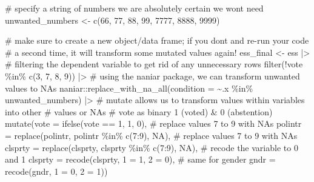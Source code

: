 \documentclass[
  letterpaper,
  DIV=11,
  numbers=noendperiod]{scrreprt}
\newenvironment{Shaded}{\begin{snugshade}}{\end{snugshade}}
\newcommand{\AttributeTok}[1]{\textcolor[rgb]{0.40,0.45,0.13}{#1}}
\newcommand{\CommentTok}[1]{\textcolor[rgb]{0.37,0.37,0.37}{#1}}
\newcommand{\ConstantTok}[1]{\textcolor[rgb]{0.56,0.35,0.01}{#1}}
\newcommand{\DecValTok}[1]{\textcolor[rgb]{0.68,0.00,0.00}{#1}}
\newcommand{\FunctionTok}[1]{\textcolor[rgb]{0.28,0.35,0.67}{#1}}
\newcommand{\NormalTok}[1]{\textcolor[rgb]{0.00,0.23,0.31}{#1}}
\newcommand{\OtherTok}[1]{\textcolor[rgb]{0.00,0.23,0.31}{#1}}
\newcommand{\SpecialCharTok}[1]{\textcolor[rgb]{0.37,0.37,0.37}{#1}}
\newcommand{\StringTok}[1]{\textcolor[rgb]{0.13,0.47,0.30}{#1}}
\begin{document}
\begin{Shaded}
\begin{Highlighting}[]
\CommentTok{\# specify a string of numbers we are absolutely certain we won\textquotesingle{}t need}
\NormalTok{unwanted\_numbers }\OtherTok{\textless{}{-}} \FunctionTok{c}\NormalTok{(}\DecValTok{66}\NormalTok{, }\DecValTok{77}\NormalTok{, }\DecValTok{88}\NormalTok{, }\DecValTok{99}\NormalTok{, }\DecValTok{7777}\NormalTok{, }\DecValTok{8888}\NormalTok{, }\DecValTok{9999}\NormalTok{)}

\CommentTok{\# make sure to create a new object/data frame; if you don\textquotesingle{}t and re{-}run your code}
\CommentTok{\# a second time, it will transform some mutated values again!}
\NormalTok{ess\_final }\OtherTok{\textless{}{-}}\NormalTok{ ess }\SpecialCharTok{|\textgreater{}} 
  \CommentTok{\# filtering the dependent variable to get rid of any unnecessary rows}
  \FunctionTok{filter}\NormalTok{(}\SpecialCharTok{!}\NormalTok{vote }\SpecialCharTok{\%in\%} \FunctionTok{c}\NormalTok{(}\DecValTok{3}\NormalTok{, }\DecValTok{7}\NormalTok{, }\DecValTok{8}\NormalTok{, }\DecValTok{9}\NormalTok{)) }\SpecialCharTok{|\textgreater{}} 
  \CommentTok{\# using the naniar package, we can transform unwanted values to NAs}
\NormalTok{  naniar}\SpecialCharTok{::}\FunctionTok{replace\_with\_na\_all}\NormalTok{(}\AttributeTok{condition =} \SpecialCharTok{\textasciitilde{}}\NormalTok{.x }\SpecialCharTok{\%in\%}\NormalTok{ unwanted\_numbers) }\SpecialCharTok{|\textgreater{}} 
  \CommentTok{\# mutate allows us to transform values within variables into other }
  \CommentTok{\# values or NAs}
  \CommentTok{\# vote as binary 1 (voted) \& 0 (abstention)}
  \FunctionTok{mutate}\NormalTok{(}\AttributeTok{vote =} \FunctionTok{ifelse}\NormalTok{(vote }\SpecialCharTok{==} \DecValTok{1}\NormalTok{, }\DecValTok{1}\NormalTok{, }\DecValTok{0}\NormalTok{), }
         \CommentTok{\# replace values 7 to 9 with NAs}
         \AttributeTok{polintr =} \FunctionTok{replace}\NormalTok{(polintr, polintr }\SpecialCharTok{\%in\%} \FunctionTok{c}\NormalTok{(}\DecValTok{7}\SpecialCharTok{:}\DecValTok{9}\NormalTok{), }\ConstantTok{NA}\NormalTok{),}
         \CommentTok{\# replace values 7 to 9 with NAs}
         \AttributeTok{clsprty =} \FunctionTok{replace}\NormalTok{(clsprty, clsprty }\SpecialCharTok{\%in\%} \FunctionTok{c}\NormalTok{(}\DecValTok{7}\SpecialCharTok{:}\DecValTok{9}\NormalTok{), }\ConstantTok{NA}\NormalTok{),}
         \CommentTok{\# recode the variable to 0 and 1}
         \AttributeTok{clsprty =} \FunctionTok{recode}\NormalTok{(clsprty, }\StringTok{\textasciigrave{}}\AttributeTok{1}\StringTok{\textasciigrave{}} \OtherTok{=} \DecValTok{1}\NormalTok{, }\StringTok{\textasciigrave{}}\AttributeTok{2}\StringTok{\textasciigrave{}} \OtherTok{=} \DecValTok{0}\NormalTok{),}
         \CommentTok{\# same for gender}
         \AttributeTok{gndr =} \FunctionTok{recode}\NormalTok{(gndr, }\StringTok{\textasciigrave{}}\AttributeTok{1}\StringTok{\textasciigrave{}} \OtherTok{=} \DecValTok{0}\NormalTok{, }\StringTok{\textasciigrave{}}\AttributeTok{2}\StringTok{\textasciigrave{}} \OtherTok{=} \DecValTok{1}\NormalTok{))}
\end{Highlighting}
\end{Shaded}
\end{document}
